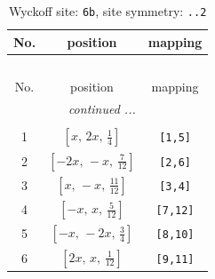 \documentclass[fleqn,8pt]{jsarticle}
\begin{document}
\begin{longtable}{ccc}
\caption{Wyckoff site: {\tt 6b}, site symmetry: {\tt ..2}}
 \\
 \hline \hline
No. & position & mapping \\ \hline \endfirsthead

\multicolumn{2}{l}{\tablename\ \thetable{}} \\
 \hline \hline
No. & position & mapping \\ \hline \endhead

 \hline \hline
\multicolumn{2}{r}{\footnotesize\it continued ...} \\ \endfoot

 \hline \hline
\multicolumn{2}{r}{} \\ \endlastfoot

1 & $\left[ x,\, 2 x,\, \frac{1}{4} \right]$ & {\tt [1,5]} \\ \hline
2 & $\left[ - 2 x,\, - x,\, \frac{7}{12} \right]$ & {\tt [2,6]} \\ \hline
3 & $\left[ x,\, - x,\, \frac{11}{12} \right]$ & {\tt [3,4]} \\ \hline
4 & $\left[ - x,\, x,\, \frac{5}{12} \right]$ & {\tt [7,12]} \\ \hline
5 & $\left[ - x,\, - 2 x,\, \frac{3}{4} \right]$ & {\tt [8,10]} \\ \hline
6 & $\left[ 2 x,\, x,\, \frac{1}{12} \right]$ & {\tt [9,11]} \\
\end{longtable}
\renewcommand{\arraystretch}{1.2}
\end{document}
